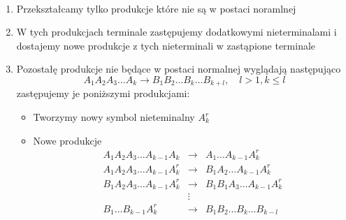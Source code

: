 	\begin{alg}~\\
		\begin{enumerate}
			\item Przekształcamy tylko produkcje które nie są w postaci noramlnej
			\item W tych produkcjach terminale zastępujemy dodatkowymi nieterminalami i dostajemy nowe produkcje
			z tych nieterminali w zastąpione terminale
			\item Pozostałę produkcje nie będące w postaci normalnej wyglądają następująco
				\begin{equation}
					A_1A_2A_3\dots A_k \rightarrow B_1B_2\dots B_k\dots B_{k+l}, \quad l > 1, k \leqslant l 
				\end{equation}
			zastępujemy je poniższymi produkcjami:
				\begin{itemize}
					\item Tworzymy nowy symbol nieteminalny $A^r_k$
					\item Nowe produkcje
						\begin{eqnarray}						
							A_1A_2A_3\dots A_{k-1}A_k &\rightarrow& A_1\dots A_{k-1}A^r_k \\
							A_1A_2A_3\dots A_{k-1}A^r_k &\rightarrow& B_1A_2\dots A_{k-1}A^r_k \\
							B_1A_2A_3\dots A_{k-1}A^r_k &\rightarrow& B_1B_1A_3\dots A_{k-1}A^r_k\\
							&\vdots&\\
							B_1\dots B_{k-1}A^r_k &\rightarrow& B_1B_2\dots B_k\dots B_{k-l}\\
						\end{eqnarray}
				\end{itemize}
		\end{enumerate}
	\end{alg}
	
	